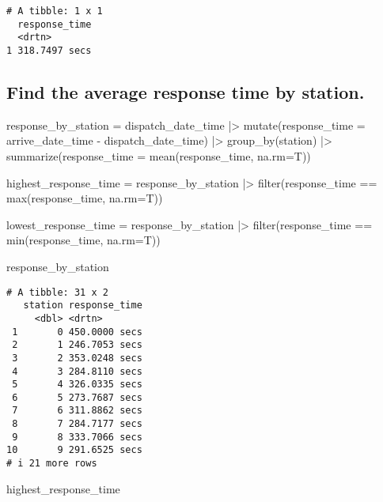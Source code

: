 \documentclass[
  letterpaper,
  DIV=11,
  numbers=noendperiod]{scrartcl}
\newenvironment{Shaded}{\begin{snugshade}}{\end{snugshade}}
\newcommand{\AttributeTok}[1]{\textcolor[rgb]{0.40,0.45,0.13}{#1}}
\newcommand{\FunctionTok}[1]{\textcolor[rgb]{0.28,0.35,0.67}{#1}}
\newcommand{\NormalTok}[1]{\textcolor[rgb]{0.00,0.23,0.31}{#1}}
\newcommand{\OtherTok}[1]{\textcolor[rgb]{0.00,0.23,0.31}{#1}}
\newcommand{\SpecialCharTok}[1]{\textcolor[rgb]{0.37,0.37,0.37}{#1}}
\begin{document}
\begin{verbatim}
# A tibble: 1 x 1
  response_time
  <drtn>       
1 318.7497 secs
\end{verbatim}

\subsection{Find the average response time by
station.}\label{find-the-average-response-time-by-station.}

\begin{Shaded}
\begin{Highlighting}[]
\NormalTok{response\_by\_station }\OtherTok{=}\NormalTok{ dispatch\_date\_time }\SpecialCharTok{|\textgreater{}}
  \FunctionTok{mutate}\NormalTok{(}\AttributeTok{response\_time =}\NormalTok{ arrive\_date\_time }\SpecialCharTok{{-}}\NormalTok{ dispatch\_date\_time) }\SpecialCharTok{|\textgreater{}}
  \FunctionTok{group\_by}\NormalTok{(station) }\SpecialCharTok{|\textgreater{}}
  \FunctionTok{summarize}\NormalTok{(}\AttributeTok{response\_time =} \FunctionTok{mean}\NormalTok{(response\_time, }\AttributeTok{na.rm=}\NormalTok{T)) }

\NormalTok{highest\_response\_time }\OtherTok{=}\NormalTok{ response\_by\_station }\SpecialCharTok{|\textgreater{}}
  \FunctionTok{filter}\NormalTok{(response\_time }\SpecialCharTok{==} \FunctionTok{max}\NormalTok{(response\_time, }\AttributeTok{na.rm=}\NormalTok{T))}
  
\NormalTok{lowest\_response\_time }\OtherTok{=}\NormalTok{ response\_by\_station }\SpecialCharTok{|\textgreater{}}
  \FunctionTok{filter}\NormalTok{(response\_time }\SpecialCharTok{==} \FunctionTok{min}\NormalTok{(response\_time, }\AttributeTok{na.rm=}\NormalTok{T))}

\NormalTok{response\_by\_station }
\end{Highlighting}
\end{Shaded}

\begin{verbatim}
# A tibble: 31 x 2
   station response_time
     <dbl> <drtn>       
 1       0 450.0000 secs
 2       1 246.7053 secs
 3       2 353.0248 secs
 4       3 284.8110 secs
 5       4 326.0335 secs
 6       5 273.7687 secs
 7       6 311.8862 secs
 8       7 284.7177 secs
 9       8 333.7066 secs
10       9 291.6525 secs
# i 21 more rows
\end{verbatim}

\begin{Shaded}
\begin{Highlighting}[]
\NormalTok{highest\_response\_time}
\end{Highlighting}
\end{Shaded}
\end{document}
